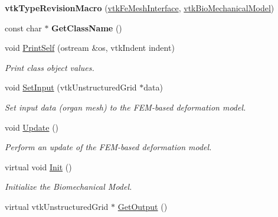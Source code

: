 \begin{DoxyCompactItemize}
\item 
\hypertarget{classvtkFeMeshInterface_a30e52fc9776971d6a0ef3ea1a51dd4db}{
{\bfseries vtkTypeRevisionMacro} (\hyperlink{classvtkFeMeshInterface}{vtkFeMeshInterface}, \hyperlink{classvtkBioMechanicalModel}{vtkBioMechanicalModel})}
\label{classvtkFeMeshInterface_a30e52fc9776971d6a0ef3ea1a51dd4db}

\item 
\hypertarget{classvtkFeMeshInterface_ab123f967cfdb9c1ff70cc9e7810d182f}{
const char $\ast$ {\bfseries GetClassName} ()}
\label{classvtkFeMeshInterface_ab123f967cfdb9c1ff70cc9e7810d182f}

\item 
\hypertarget{classvtkFeMeshInterface_acec139dd01cbdba5f1b37c308be273d3}{
void \hyperlink{classvtkFeMeshInterface_acec139dd01cbdba5f1b37c308be273d3}{PrintSelf} (ostream \&os, vtkIndent indent)}
\label{classvtkFeMeshInterface_acec139dd01cbdba5f1b37c308be273d3}

\begin{DoxyCompactList}\small\item\em Print class object values. \item\end{DoxyCompactList}\item 
void \hyperlink{classvtkFeMeshInterface_ad3b9e23968d1f8b8519cedcfd781ee26}{SetInput} (vtkUnstructuredGrid $\ast$data)
\begin{DoxyCompactList}\small\item\em Set input data (organ mesh) to the FEM-\/based deformation model. \item\end{DoxyCompactList}\item 
void \hyperlink{classvtkFeMeshInterface_a6d2c5a76db4549d74075c88691d03447}{Update} ()
\begin{DoxyCompactList}\small\item\em Perform an update of the FEM-\/based deformation model. \item\end{DoxyCompactList}\item 
\hypertarget{classvtkFeMeshInterface_ad779b72b01dd020c6e07312b40bbb77e}{
virtual void \hyperlink{classvtkFeMeshInterface_ad779b72b01dd020c6e07312b40bbb77e}{Init} ()}
\label{classvtkFeMeshInterface_ad779b72b01dd020c6e07312b40bbb77e}

\begin{DoxyCompactList}\small\item\em Initialize the Biomechanical Model. \item\end{DoxyCompactList}\item 
\hypertarget{classvtkFeMeshInterface_a7dce06411f5bdee1e5d737043ad87e0b}{
virtual vtkUnstructuredGrid $\ast$ \hyperlink{classvtkFeMeshInterface_a7dce06411f5bdee1e5d737043ad87e0b}{GetOutput} ()}
\label{classvtkFeMeshInterface_a7dce06411f5bdee1e5d737043ad87e0b}


\end{DoxyCompactItemize}
